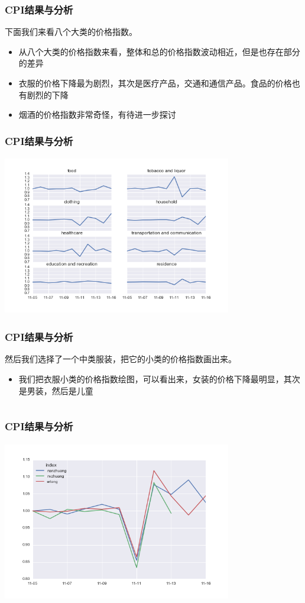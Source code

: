\documentclass{beamer}
\begin{document}
\begin{frame}
\frametitle{CPI结果与分析}
下面我们来看八个大类的价格指数。
\begin{itemize}
  \item 从八个大类的价格指数来看，整体和总的价格指数波动相近，但是也存在部分的差异
  \item 衣服的价格下降最为剧烈，其次是医疗产品，交通和通信产品。食品的价格也有剧烈的下降
  \item 烟酒的价格指数非常奇怪，有待进一步探讨
\end{itemize}
\end{frame}

\begin{frame}
\frametitle{CPI结果与分析}
\includegraphics[width=10cm,height=7cm]{double11_8cate.png}
\end{frame}

\begin{frame}
\frametitle{CPI结果与分析}
然后我们选择了一个中类服装，把它的小类的价格指数画出来。
\begin{itemize}
  \item 我们把衣服小类的价格指数绘图，可以看出来，女装的价格下降最明显，其次是男装，然后是儿童
\end{itemize}
\end{frame}

\section{}
\subsection{}
\begin{frame}
\frametitle{CPI结果与分析}
\includegraphics[width=10cm,height=7cm]{double11_data_addindex.png}
\end{frame}
\end{document}
